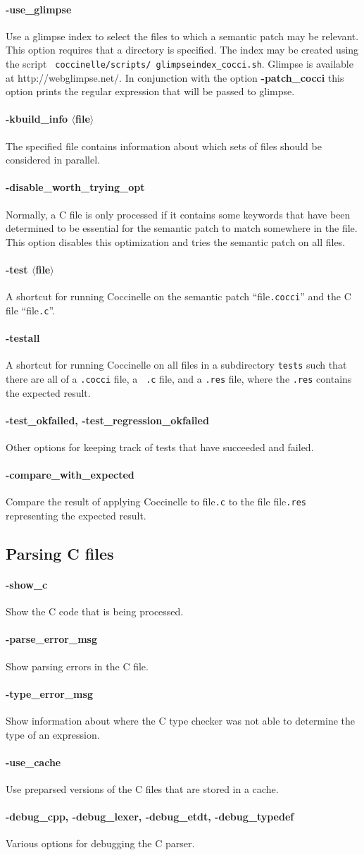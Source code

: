 \documentclass{article}
\newcommand{\normal}[2]{\paragraph*{\makebox[0in][r]{\BigLowerDiamond\,\,} {{#1}}} {#2}}
\newcommand{\rare}[2]{\paragraph*{\makebox[0in][r]{\BigDiamondshape\,\,} {{#1}}} {#2}}
\newcommand{\developer}[2]{\paragraph*{{#1}} {#2}}
\begin{document}
\normal{-use\_glimpse}{ Use a glimpse index to select the files to which
a semantic patch may be relevant.  This option requires that a directory is
specified.  The index may be created using the script {\tt
  coccinelle/scripts/ glimpseindex\_cocci.sh}.  Glimpse is available at
http://webglimpse.net/.  In conjunction with the option {\bf -patch\_cocci}
this option prints the regular expression that will be passed to glimpse.}

\developer{-kbuild\_info $\langle$file$\rangle$}{ The specified file
  contains information about which sets of files should be considered in
  parallel.}

\developer{-disable\_worth\_trying\_opt}{Normally, a C file is only
  processed if it contains some keywords that have been determined to be
  essential for the semantic patch to match somewhere in the file.  This
  option disables this optimization and tries the semantic patch on all files.}

\developer{-test $\langle$file$\rangle$}{ A shortcut for running Coccinelle
on the semantic patch ``file{\tt{.cocci}}'' and the C file ``file{\tt{.c}}''.}

\developer{-testall}{A shortcut for running Coccinelle on all files in a
  subdirectory {\tt tests} such that there are all of a {\tt .cocci} file, a {\tt
    .c} file, and a {\tt .res} file, where the {\tt .res} contains the
  expected result.}

\developer{-test\_okfailed, -test\_regression\_okfailed} Other options for
keeping track of tests that have succeeded and failed.

\developer{-compare\_with\_expected}{Compare the result of applying
  Coccinelle to file{\tt{.c}} to the file file{\tt{.res}} representing the
  expected result.}

\subsection{Parsing C files}

\rare{-show\_c}{Show the C code that is being processed.}

\rare{-parse\_error\_msg}{Show parsing errors in the C file.}

\rare{-type\_error\_msg}{Show information about where the C type checker
  was not able to determine the type of an expression.}

\developer{-use\_cache} Use preparsed versions of the C files that are
stored in a cache.

\developer{-debug\_cpp, -debug\_lexer, -debug\_etdt,
  -debug\_typedef}{Various options for debugging the C parser.}
\end{document}
